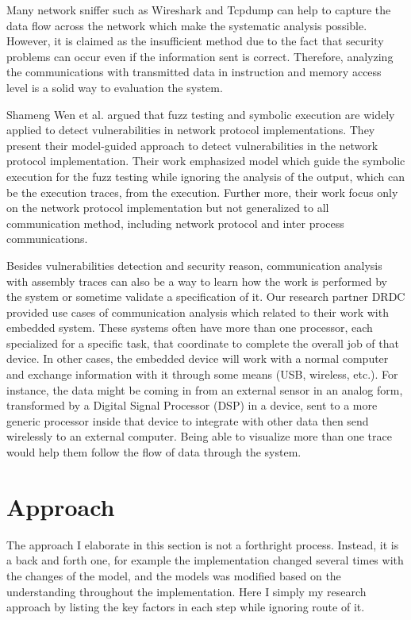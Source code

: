 Many network sniffer such as Wireshark\cite{_wireshark_????} and Tcpdump\cite{tcpdump_tcpdump/libpcap_????} can help to capture the data flow across the network which make the systematic analysis possible. However, it is claimed as the insufficient method due to the fact that security problems can occur even if the information sent is correct. Therefore, analyzing the communications with transmitted data in instruction and memory access level is a solid way to evaluation the system.

Shameng Wen et al. argued that fuzz testing and symbolic execution are widely applied to detect vulnerabilities in network protocol implementations. They present their model-guided approach to detect vulnerabilities in the network protocol implementation. Their work emphasized model which guide the symbolic execution for the fuzz testing while ignoring the analysis of the output, which can be the execution traces, from the execution. \cite{wen2017model} Further more, their work focus only on the network protocol implementation but not generalized to all communication method, including network protocol and inter process communications.

Besides vulnerabilities detection and security reason, communication analysis with assembly traces can also be a way to learn how the work is performed by the system or sometime validate a specification of it. Our research partner DRDC provided use cases of communication analysis which related to their work with embedded system. These systems often have more than one processor, each specialized for a specific task, that coordinate to complete the overall job of that device.  In other cases, the embedded device will work with a normal computer and exchange information with it through some means
(USB, wireless, etc.).  For instance, the data might be coming in from an external sensor in an analog form, transformed by a Digital Signal Processor (DSP) in a device, sent to a more generic processor inside that device to integrate with other data then send wirelessly to an external computer. Being able to visualize more than one trace would help them follow the flow of data through the system.

\section{Approach}
The approach I elaborate in this section is not a forthright process. Instead, it is a back and forth one, for example the implementation changed several times with the changes of the model, and the models was modified based on the understanding throughout the implementation. Here I simply my research approach by listing the key factors in each step while ignoring route of it.

